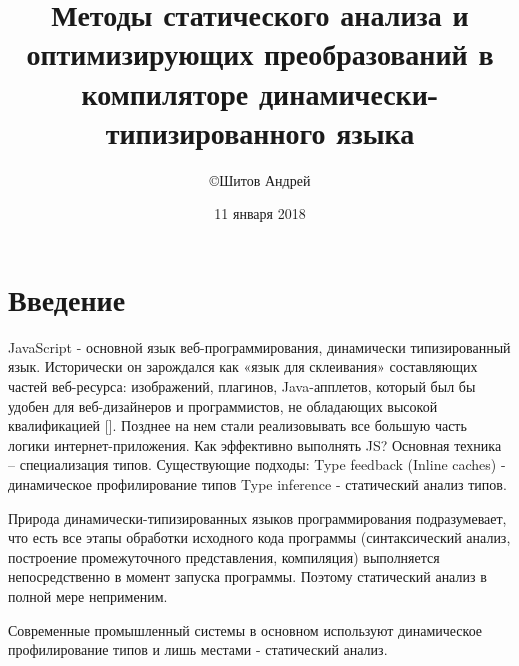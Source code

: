 \documentclass{article}
\title{Методы статического анализа и оптимизирующих преобразований в компиляторе динамически-типизированного языка}
\author{\copyright Шитов Андрей}
\date{11 января 2018}
\begin{document}
\maketitle
\thispagestyle{empty}
\newpage

\tableofcontents
\newpage

\section{Введение}

JavaScript - основной язык веб-программирования, динамически типизированный язык.
Исторически он зарождался как «язык для склеивания» составляющих частей веб-ресурса: изображений, плагинов, Java-апплетов, который был бы удобен для веб-дизайнеров и программистов, не обладающих высокой квалификацией []. Позднее на нем стали реализовывать все большую часть логики интернет-приложения. Как эффективно выполнять JS? 
Основная техника – специализация типов.
Существующие подходы:
Type feedback (Inline caches) - динамическое профилирование типов
Type inference - статический анализ типов.

Природа динамически-типизированных языков программирования подразумевает, что есть все этапы обработки исходного кода программы (синтаксический анализ, построение промежуточного представления, компиляция) выполняется непосредственно в момент запуска программы. Поэтому статический анализ в полной мере неприменим.

Современные промышленный системы в основном используют динамическое профилирование типов и лишь местами - статический анализ.

\end{document}
